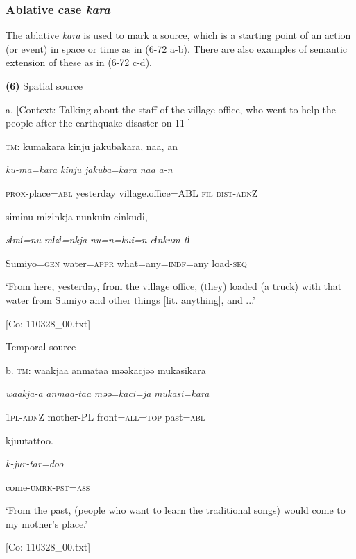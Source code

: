 \subsubsection{ Ablative case \textit{kara}}

The ablative \textit{kara} is used to mark a source, which is a starting point of an action (or event) in space or time as in (6-72 a-b). There are also examples of semantic extension of these as in (6-72 c-d).

\textbf{(6)}  Spatial source

  a.  [Context: Talking about the staff of the village office, who went to help the people after the earthquake disaster on 11 \citealt{March2011}]

    \textsc{tm}:  kumakara  kinju  jakubakara,  naa,  an

      \textit{ku-ma=kara}  \textit{kinju}  \textit{jakuba=kara}  \textit{naa}  \textit{a-n}

      \textsc{prox}-place=\textsc{abl}  yesterday  village.office=ABL  \textsc{fil}  \textsc{dist}-\textsc{adn}Z

      sɨmɨnu  mɨzɨnkja  nunkuin  cɨnkudɨ,

      \textit{sɨmɨ=nu}  \textit{mɨzɨ=nkja}  \textit{nu=n=kui=n}  \textit{cɨnkum-tɨ}

      Sumiyo=\textsc{gen}  water=\textsc{appr}  what=any=\textsc{indf}=any  load-\textsc{seq}

      ‘From here, yesterday, from the village office, (they) loaded (a truck) with that water from Sumiyo and other things [lit. anything], and ...’

      [Co: 110328\_00.txt]

  Temporal source

  b.  \textsc{tm}:  waakjaa  anmataa  məəkacjəə  mukasikara

      \textit{waakja-a}  \textit{anmaa-taa}  \textit{məə=kaci=ja}  \textit{mukasi=kara}

      1\textsc{pl}-\textsc{adn}Z  mother-PL  front=\textsc{all}=\textsc{top}  past=\textsc{abl}

      kjuutattoo.

      \textit{k-jur-tar=doo}

      come-\textsc{umrk}-\textsc{pst}=\textsc{ass}

      ‘From the past, (people who want to learn the traditional songs) would come to my mother’s place.’

      [Co: 110328\_00.txt]

